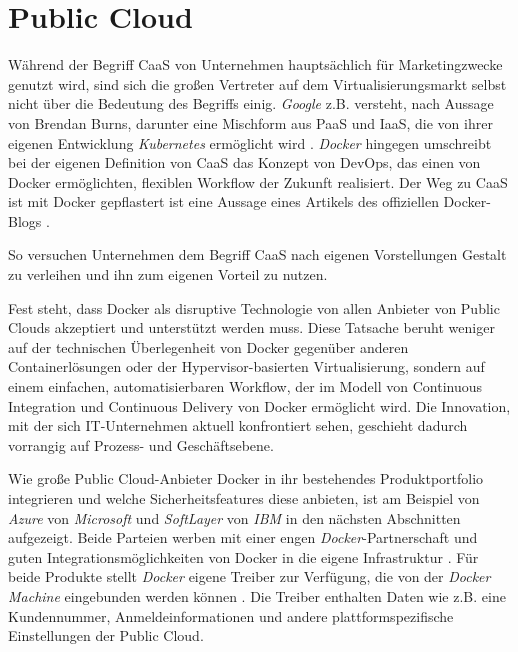 \documentclass[../main.tex]{subfiles}
\begin{document}



  \section{Public Cloud}
  \label{publicCloud}
    Während der Begriff CaaS von Unternehmen hauptsächlich für Marketingzwecke genutzt wird, sind sich die großen Vertreter auf dem Virtualisierungsmarkt selbst nicht über die Bedeutung des Begriffs einig. \emph{Google} z.B. versteht, nach Aussage von Brendan Burns, darunter eine Mischform aus PaaS und IaaS, die von ihrer eigenen Entwicklung \emph{Kubernetes} ermöglicht wird \cite[S.12]{slideshareContainerKubernetes}.
    \emph{Docker} hingegen umschreibt bei der eigenen Definition von CaaS das Konzept von DevOps, das einen von Docker ermöglichten, flexiblen Workflow der Zukunft realisiert. \glqq{}Der Weg zu CaaS ist mit Docker gepflastert \grqq{} ist eine Aussage eines Artikels des offiziellen Docker-Blogs \cite{dockerCAAS}.

    So versuchen Unternehmen dem Begriff CaaS nach eigenen Vorstellungen Gestalt zu verleihen und ihn zum eigenen Vorteil zu nutzen.

    Fest steht, dass Docker als disruptive Technologie von allen Anbieter von Public Clouds akzeptiert und unterstützt werden muss. Diese Tatsache beruht weniger auf der technischen Überlegenheit von Docker gegenüber anderen Containerlösungen oder der Hypervisor-basierten Virtualisierung, sondern auf einem einfachen, automatisierbaren Workflow, der im Modell von Continuous Integration und Continuous Delivery von Docker ermöglicht wird. Die Innovation, mit der sich IT-Unternehmen aktuell konfrontiert sehen, geschieht dadurch vorrangig auf Prozess- und Geschäftsebene.

    Wie große Public Cloud-Anbieter Docker in ihr bestehendes Produktportfolio integrieren und welche Sicherheitsfeatures diese anbieten, ist am Beispiel von \emph{Azure} von \emph{Microsoft} und \emph{SoftLayer} von \emph{IBM} in den nächsten Abschnitten aufgezeigt. Beide Parteien werben mit einer engen \emph{Docker}-Partnerschaft und guten Integrationsmöglichkeiten von Docker in die eigene Infrastruktur \cite{dockerPartnershipMicrosoft}\cite{dockerPartnershipIBM}. Für beide Produkte stellt \emph{Docker} eigene Treiber zur Verfügung, die von der \emph{Docker Machine} eingebunden werden können \cite{dockerMachineDriverAzure}\cite{dockerMachineDriverSoftlayer}. Die Treiber enthalten Daten wie z.B. eine Kundennummer, Anmeldeinformationen und andere plattformspezifische Einstellungen der Public Cloud.
\end{document}
